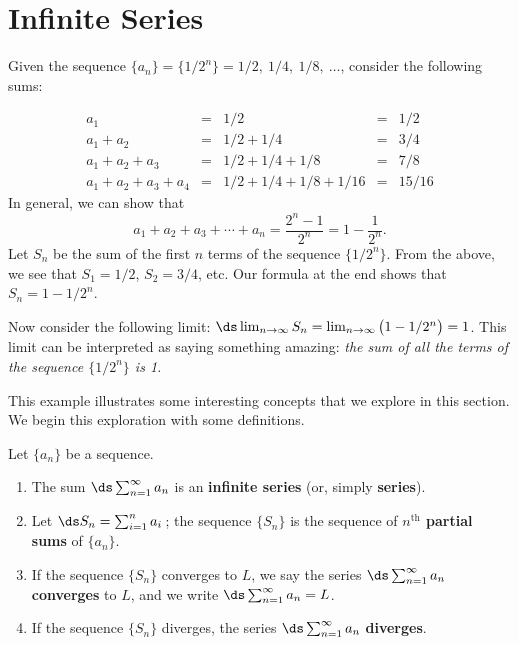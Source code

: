\section{Infinite Series}\label{sec:series}

Given the sequence $\{a_n\} = \{1/2^n\} = 1/2,\ 1/4,\ 1/8,\ \ldots$, consider the following sums:

$$\begin{array}{ccccc}
a_1				&=& 1/2					 &=& 1/2\\
a_1+a_2		&=& 1/2+1/4			 &=& 3/4\\
a_1+a_2+a_3 &=& 1/2+1/4+1/8  &=& 7/8\\
a_1+a_2+a_3+a_4 &=& 1/2+1/4+1/8+1/16 & =& 15/16
\end{array}$$
In general, we can show that $$a_1+a_2+a_3+\cdots +a_n = \frac{2^n-1}{2^n} = 1-\frac{1}{2^n}.$$
Let $S_n$ be the sum of the first $n$ terms of the sequence $\{1/2^n\}$. From the above, we see that $S_1=1/2$, $S_2 = 3/4$, etc. Our formula at the end shows that $S_n = 1-1/2^n$. 

Now consider the following limit: $\ds \lim_{n\to\infty}S_n = \lim_{n\to\infty}\big(1-1/2^n\big) = 1$. This limit can be interpreted as saying something amazing: \emph{the sum of \emph{all} the terms of the sequence $\{1/2^n\}$ is 1.} 

\enlargethispage{\baselineskip}

This example illustrates some interesting concepts that we explore in this section. We begin this exploration with some definitions.

\setboxwidth{50pt}
{Let $\{a_n\}$ be a sequence.
\begin{enumerate}
\item		The sum $\ds \sum_{n=1}^\infty a_n$ is an \textbf{infinite series} (or, simply \textbf{series}).
\item		Let $\ds S_n = \sum_{i=1}^n a_i$\,; the sequence $\{S_n\}$ is the sequence of \textbf{$n^\text{th}$ partial sums} of $\{a_n\}$.
\item		If the sequence $\{S_n\}$ converges to $L$, we say the series $\ds \sum_{n=1}^\infty a_n$ \textbf{converges} to $L$, and we write $\ds \sum_{n=1}^\infty a_n = L$.
\item		If the sequence $\{S_n\}$ diverges, the series $\ds \sum_{n=1}^\infty a_n$ \textbf{diverges}.
\end{enumerate}
}
\restoreboxwidth

